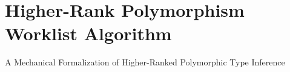 \chapter{Higher-Rank Polymorphism Worklist Algorithm}
\label{chap:ICFP}

A Mechanical Formalization of Higher-Ranked Polymorphic
  Type Inference




%






